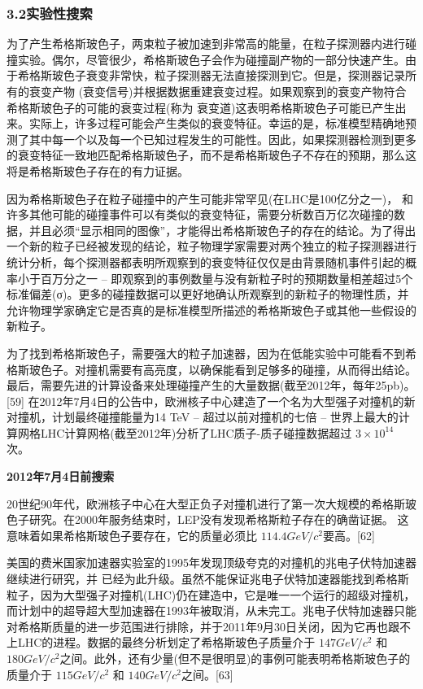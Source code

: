 \subsubsection{3.2实验性搜索}

为了产生希格斯玻色子，两束粒子被加速到非常高的能量，在粒子探测器内进行碰撞实验。偶尔，尽管很少，希格斯玻色子会作为碰撞副产物的一部分快速产生。由于希格斯玻色子衰变非常快，粒子探测器无法直接探测到它。但是，探测器记录所有的衰变产物 (衰变信号)并根据数据重建衰变过程。如果观察到的衰变产物符合希格斯玻色子的可能的衰变过程(称为 衰变道)这表明希格斯玻色子可能已产生出来。实际上，许多过程可能会产生类似的衰变特征。幸运的是，标准模型精确地预测了其中每一个以及每一个已知过程发生的可能性。因此，如果探测器检测到更多的衰变特征一致地匹配希格斯玻色子，而不是希格斯玻色子不存在的预期，那么这将是希格斯玻色子存在的有力证据。

因为希格斯玻色子在粒子碰撞中的产生可能非常罕见(在LHC是100亿分之一)， 和许多其他可能的碰撞事件可以有类似的衰变特征，需要分析数百万亿次碰撞的数据，并且必须“显示相同的图像”，才能得出希格斯玻色子的存在的结论。为了得出一个新的粒子已经被发现的结论，粒子物理学家需要对两个独立的粒子探测器进行统计分析，每个探测器都表明所观察到的衰变特征仅仅是由背景随机事件引起的概率小于百万分之一 – 即观察到的事例数量与没有新粒子时的预期数量相差超过5个标准偏差(σ)。更多的碰撞数据可以更好地确认所观察到的新粒子的物理性质，并允许物理学家确定它是否真的是标准模型所描述的希格斯玻色子或其他一些假设的新粒子。

为了找到希格斯玻色子，需要强大的粒子加速器，因为在低能实验中可能看不到希格斯玻色子。对撞机需要有高亮度，以确保能看到足够多的碰撞，从而得出结论。最后，需要先进的计算设备来处理碰撞产生的大量数据(截至2012年，每年25pb)。[59] 在2012年7月4日的公告中，欧洲核子中心建造了一个名为大型强子对撞机的新对撞机，计划最终碰撞能量为14 TeV – 超过以前对撞机的七倍 – 世界上最大的计算网格LHC计算网格(截至2012年)分析了LHC质子-质子碰撞数据超过 $3\times10^{14}$ 次。

\textbf{2012年7月4日前搜索}

20世纪90年代，欧洲核子中心在大型正负子对撞机进行了第一次大规模的希格斯玻色子研究。在2000年服务结束时，LEP没有发现希格斯粒子存在的确凿证据。 这意味着如果希格斯玻色子要存在，它的质量必须比 $114.4 GeV/c^{2}$要高。[62]

美国的费米国家加速器实验室的1995年发现顶级夸克的对撞机的兆电子伏特加速器继续进行研究，并 已经为此升级。虽然不能保证兆电子伏特加速器能找到希格斯粒子，因为大型强子对撞机(LHC)仍在建造中，它是唯一一个运行的超级对撞机，而计划中的超导超大型加速器在1993年被取消，从未完工。兆电子伏特加速器只能对希格斯质量的进一步范围进行排除，并于2011年9月30日关闭，因为它再也跟不上LHC的进程。数据的最终分析划定了希格斯玻色子质量介于 $147 GeV/c^{2}$ 和 $180 GeV/c^{2}$之间。此外，还有少量(但不是很明显)的事例可能表明希格斯玻色子的质量介于 $115 GeV/c^{2}$ 和 $140 GeV/c^{2}$之间。[63]

